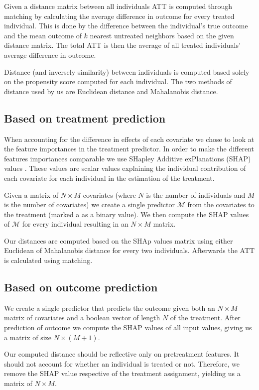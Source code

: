 \documentclass{article}
\begin{document}
Given a distance matrix between all individuals ATT is computed through matching by calculating the average difference in outcome for every treated individual. This is done by the difference between the individual's true outcome and the mean outcome of $k$ nearest untreated neighbors based on the given distance matrix. The total ATT is then the average of all treated individuals' average difference in outcome.

Distance (and inversely similarity) between individuals is computed based solely on the propensity score computed for each individual. The two methods of distance used by us are Euclidean distance and Mahalanobis distance.


\subsection{Based on treatment prediction}
When accounting for the difference in effects of each covariate we chose to look at the feature importances in the treatment predictor. In order to make the different features importances comparable we use SHapley Additive exPlanations (SHAP) values \cite{lundberg2017unified}. These values are scalar values explaining the individual contribution of each covariate for each individual in the estimation of the treatment. 

Given a matrix of $N\times{}M$ covariates (where $N$ is the number of individuals and $M$ is the number of covariates) we create a single predictor $\mathcal{M}$ from the covariates to the treatment (marked a as a binary value). We then compute the SHAP values of $\mathcal{M}$ for every individual resulting in an $N\times{}M$ matrix. 

Our distances are computed based on the SHAp values matrix using either Euclidean of Mahalanobis distance for every two individuals. Afterwards the ATT is calculated using matching. 

\subsection{Based on outcome prediction}
We create a single predictor that predicts the outcome given both an $N\times{}M$ matrix of covariates and a boolean vector of length $N$ of the treatment. After prediction of outcome we compute the SHAP values of all input values, giving us a matrix of size $N\times{}(M+1)$. 

Our computed distance should be reflective only on pretreatment features. It should not account for whether an individual is treated or not. Therefore, we remove the SHAP value respective of the treatment assignment, yielding us a matrix of $N\times{}M$. 
\end{document}
